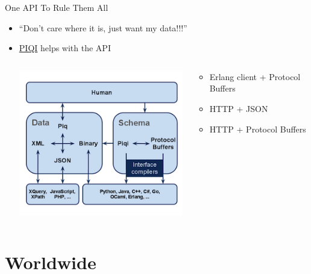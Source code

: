 \documentclass[aspectratio=169]{beamer}
\begin{document}
\begin{frame}{One API To Rule Them All}
    \begin{itemize}
        \item ``Don't care where it is, just want my data!!!''
        \pause
        \item \href{http://piqi.org}{PIQI} helps with the API
        \begin{columns}
            \begin{column}[c]{0.3\textwidth}
                \includegraphics[width=\textwidth]{images/piqi.png}
            \end{column}
            \begin{column}[c]{0.6\textwidth}
                \begin{itemize}
                    \item Erlang client + Protocol Buffers
                    \item HTTP + JSON
                    \item HTTP + Protocol Buffers
                \end{itemize}
            \end{column}
        \end{columns}
    \end{itemize}
\end{frame}

\section{Worldwide}
\end{document}
